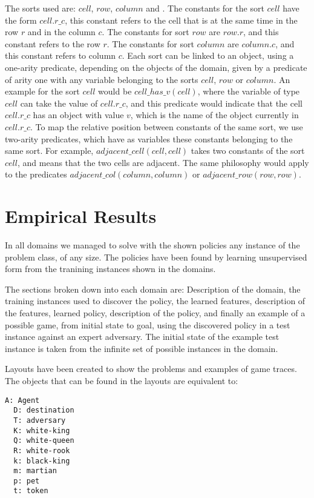 \documentclass[a4paper]{article}
\begin{document}
The sorts used are: $cell$, $row$, $column$ and . The constants for the sort $cell$ have the form $cell.r\_c$, this constant refers to the cell that is at the same time in the row $r$ and in the column $c$. The constants for sort $row$ are $row.r$, and this constant refers to the row $r$. The constants for sort $column$ are $column.c$, and this constant refers to column $c$. Each sort can be linked to an object, using a one-arity predicate, depending on the objects of the domain, given by a predicate of arity one with any variable belonging to the sorts $cell$, $row$ or $column$. An example for the sort $cell$ would be $cell\_has\_v(cell)$, where the variable of type $cell$ can take the value of $cell.r\_c$, and this predicate would indicate that the cell $cell.r\_c$ has an object with value $v$, which is the name of the object currently in $cell.r\_c$. To map the relative position between constants of the same sort, we use two-arity predicates, which have as variables these constants belonging to the same sort. For example, $adjacent\_cell(cell, cell)$ takes two constants of the sort $cell$, and means that the two cells are adjacent. The same philosophy would apply to the predicates $adjacent\_col(column, column)$ or $adjacent\_row(row, row)$.


\newpage

\section{Empirical Results}

In all domains we managed to solve with the shown policies any instance of the problem class, of any size. The policies have been found by learning unsupervised form from the tranining instances shown in the domains.

The sections broken down into each domain are: Description of the domain, the training instances used to discover the policy, the learned features, description of the features, learned policy, description of the policy, and finally an example of a possible game, from initial state to goal, using the discovered policy in a test instance against an expert adversary. The initial state of the example test instance is taken from the infinite set of possible instances in the domain.

Layouts have been created to show the problems and examples of game traces. The objects that can be found in the layouts are equivalent to:
\begin{Verbatim}[fontsize=\footnotesize]
  A: Agent
  D: destination
  T: adversary
  K: white-king
  Q: white-queen
  R: white-rook
  k: black-king
  m: martian
  p: pet
  t: token
\end{Verbatim}
\end{document}
